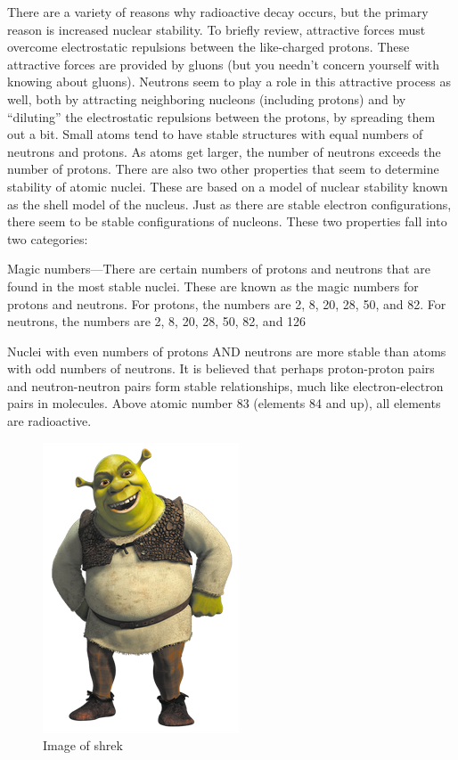 There are a variety of reasons why radioactive decay occurs, but the primary reason is increased 
nuclear stability. To briefly review, attractive forces must overcome electrostatic repulsions 
between the like-charged protons. These attractive forces are provided by gluons (but you needn’t
concern yourself with knowing about gluons). Neutrons seem to play a role in this attractive 
process as well, both by attracting neighboring nucleons (including protons) and by “diluting” 
the electrostatic repulsions between the protons, by spreading them out a bit. Small atoms tend 
to have stable structures with equal numbers of neutrons and protons. As atoms get larger, the 
number of neutrons exceeds the number of protons. There are also two other properties that seem 
to determine stability of atomic nuclei. These are based on a model of nuclear stability known as 
the shell model of the nucleus. Just as there are stable electron configurations, there seem to be 
stable configurations of nucleons. These two properties fall into two categories:
\begin{enum}
    \item Magic numbers—There are certain numbers of protons and neutrons that are found in the 
        most stable nuclei. These are known as the magic numbers for protons and neutrons. For 
        protons, the numbers are 2, 8, 20, 28, 50, and 82. For neutrons, the numbers are 2, 8, 20,
        28, 50, 82, and 126
    \item Nuclei with even numbers of protons AND neutrons are more stable than atoms with odd 
        numbers of neutrons. It is believed that perhaps proton-proton pairs and neutron-neutron pairs 
        form stable relationships, much like electron-electron pairs in molecules. Above atomic number 
        83 (elements 84 and up), all elements are radioactive.
\end{enum}

\begin{figure}[ht]
    \centering
    \includegraphics[width=0.5 \textwidth ]{../figures/shrek.png}
    \caption{Image of shrek}
    \label{fig:shrek}
\end{figure}
